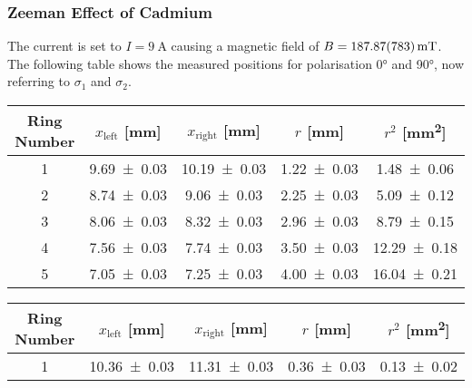 \subsubsection{Zeeman Effect of Cadmium}
\label{toc:CdZeeman}
The current is set to $I = \SI{9}{\ampere}$ causing a magnetic field of $B = \SI{187.87 \pm 7.83}{\milli\tesla}$.
The following table shows the measured positions for polarisation \ang{0} and \ang{90}, now referring to $\sigma_1$ and $\sigma_2$. 
\begin{table}[ht]
	\centering
	\begin{minipage}{0.48\textwidth}
		\begin{adjustbox}{width=\textwidth}
			\centering
			\begin{tabular}{c c c c c}
				Ring Number		& $x_\text{left}$ [\si{\mm}]	& $x_\text{right}$ [\si{\mm}]	& $r$ [\si{\mm}]	& $r^2$ [\si{\mm\squared}]	\\
				\hline
				1			& \num{9.69 \pm 0.03} 		& \num{10.19 \pm 0.03} 		& \num{1.22 \pm 0.03} 	& \num{1.48 \pm 0.06} 		\\
				2			& \num{8.74 \pm 0.03} 		& \num{9.06 \pm 0.03} 		& \num{2.25 \pm 0.03} 	& \num{5.09 \pm 0.12} 		\\
				3			& \num{8.06 \pm 0.03} 		& \num{8.32 \pm 0.03} 		& \num{2.96 \pm 0.03} 	& \num{8.79 \pm 0.15} 		\\
				4			& \num{7.56 \pm 0.03} 		& \num{7.74 \pm 0.03} 		& \num{3.50 \pm 0.03} 	& \num{12.29 \pm 0.18} 		\\
				5			& \num{7.05 \pm 0.03} 		& \num{7.25 \pm 0.03} 		& \num{4.00 \pm 0.03} 	& \num{16.04 \pm 0.21} 		\\
			\end{tabular}
		\end{adjustbox}
	\end{minipage}
	\hfill
	\begin{minipage}{0.48\textwidth}
		\begin{adjustbox}{width=\textwidth}
			\centering
			\begin{tabular}{c c c c c}
				Ring Number		& $x_\text{left}$ [\si{\mm}]	& $x_\text{right}$ [\si{\mm}]	& $r$ [\si{\mm}]	& $r^2$ [\si{\mm\squared}]	\\
				\hline
				1			& \num{10.36 \pm 0.03} 		& \num{11.31 \pm 0.03} 		& \num{0.36 \pm 0.03} 	& \num{0.13 \pm 0.02} 		\\

\end{tabular}
\end{adjustbox}
\end{minipage}
\end{table}
